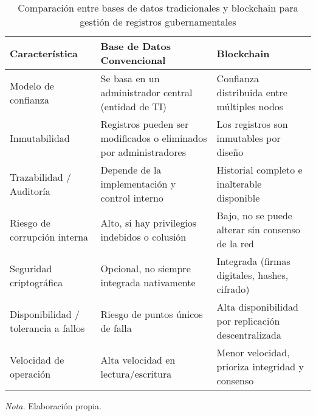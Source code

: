 \begin{table}[htbp]
    \centering
    \caption{Comparación entre bases de datos tradicionales y blockchain para gestión de registros gubernamentales}
    \begin{tabular}{p{4.5cm} p{5.2cm} p{5.2cm}}
        \toprule
        \textbf{Característica} & \textbf{Base de Datos Convencional} & \textbf{Blockchain} \\
        \midrule
        Modelo de confianza & Se basa en un administrador central (entidad de TI) & Confianza distribuida entre múltiples nodos \\
        Inmutabilidad & Registros pueden ser modificados o eliminados por administradores & Los registros son inmutables por diseño \\
        Trazabilidad / Auditoría & Depende de la implementación y control interno & Historial completo e inalterable disponible \\
        Riesgo de corrupción interna & Alto, si hay privilegios indebidos o colusión & Bajo, no se puede alterar sin consenso de la red \\
        Seguridad criptográfica & Opcional, no siempre integrada nativamente & Integrada (firmas digitales, hashes, cifrado) \\
        Disponibilidad / tolerancia a fallos & Riesgo de puntos únicos de falla & Alta disponibilidad por replicación descentralizada \\
        Velocidad de operación & Alta velocidad en lectura/escritura & Menor velocidad, prioriza integridad y consenso \\
        \bottomrule
    \end{tabular}
    \vspace{1em}
    \begin{flushleft}
        \textit{Nota.} Elaboración propia.
    \end{flushleft}
    \label{tab:comparacion_bd_blockchain}
\end{table}